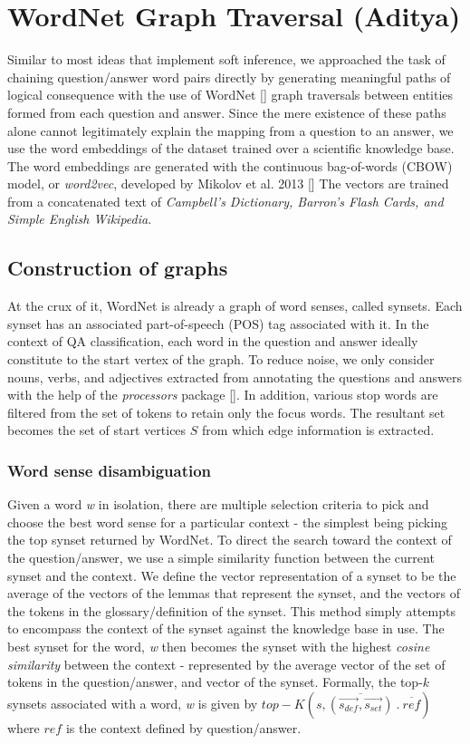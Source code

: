 \section{WordNet Graph Traversal (Aditya)}
Similar to most ideas that implement soft inference, we approached the task of chaining
question/answer word pairs directly by generating meaningful paths of logical consequence
with the use of WordNet [\cite{wordnet}] graph traversals between entities formed from
each question and answer. Since the mere existence of these paths alone cannot legitimately
explain the mapping from a question to an answer, we use the word embeddings of the dataset
trained over a scientific knowledge base. The word embeddings are generated with the 
continuous bag-of-words (CBOW) model, or \emph{word2vec}, developed by Mikolov et al. 2013 [\cite{w2v}]
The vectors are trained from a concatenated text of \emph{Campbell's Dictionary, Barron's Flash Cards,
and Simple English Wikipedia}.

\subsection{Construction of graphs}
At the crux of it, WordNet is already a graph of word senses, called synsets. Each synset has 
an associated part-of-speech (POS) tag associated with it. In the context of QA classification,
each word in the question and answer ideally constitute to the start vertex of the graph.
To reduce noise, we only consider nouns, verbs, and adjectives extracted from annotating the 
questions and answers with the help of the \emph{processors} package [\cite{processors}].
In addition, various stop words are filtered from the set of tokens to retain only the focus words. 
The resultant set becomes the set of start vertices $S$ from which edge information is extracted.

\subsubsection{Word sense disambiguation}
Given a word \emph{w} in isolation, there are multiple selection criteria to pick and choose the 
best word sense for a particular context - the simplest being picking the top synset returned by
WordNet. To direct the search toward the context of the question/answer, we use a simple similarity
function between the current synset and the context. We define the vector representation of a 
synset to be the average of the vectors of the lemmas that represent the synset, and the vectors of
the tokens in the glossary/definition of the synset. This method simply attempts to encompass the
context of the synset against the knowledge base in use. The best synset for the word, \emph{w} then
becomes the synset with the highest \emph{cosine similarity} between the context - represented
by the average vector of the set of tokens in the question/answer, and vector of the synset.
Formally, the top-$k$ synsets associated with a word, \emph{w} is given by
$top-K(s, \overline{(\vec{s_{def}}, \vec{s_{set}})}\ \textbf{.}\ \overline{ref})$ where $ref$ is
the context defined by question/answer.

